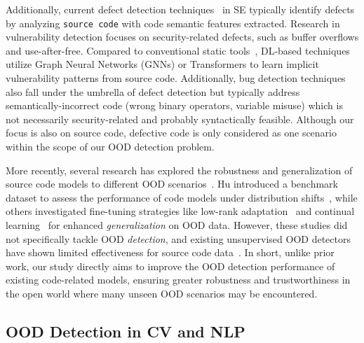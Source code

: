 Additionally, current defect detection techniques~\cite{lu2021codexglue} in SE typically identify defects by analyzing \texttt{\small source code} with code semantic features extracted. Research in vulnerability detection focuses on security-related defects, such as buffer overflows and use-after-free. Compared to conventional static tools~\cite{CodeQLtool, Checkmarxtool}, DL-based techniques~\cite{sejfia2024toward, steenhoek2024dataflow, cul2024liu, vul2024cao} utilize Graph Neural Networks (GNNs) or Transformers to learn implicit vulnerability patterns from source code. Additionally, bug detection techniques~\cite{kanade2020learning, chen2021plur, allamanis2021self, he2022distribution} also fall under the umbrella of defect detection but typically address semantically-incorrect code (\eg wrong binary operators, variable misuse) which is not necessarily security-related and probably syntactically feasible. Although our focus is also on source code, defective code is only considered as one scenario within the scope of our OOD detection problem. 

More recently, several research has explored the robustness and generalization of source code models to different OOD scenarios~\cite{hu2023codes, weyssow2023usage, hajipour2024simscood}. Hu \etal introduced a benchmark dataset to assess the performance of code models under distribution shifts~\cite{hu2023codes}, while others investigated fine-tuning strategies like low-rank adaptation~\cite{hajipour2024simscood} and continual learning~\cite{weyssow2023usage} for enhanced \textit{generalization} on OOD data. However, these studies did not specifically tackle OOD \textit{detection}, and existing unsupervised OOD detectors have shown limited effectiveness for source code data~\cite{hu2023codes}. In short, unlike prior work, our study directly aims to improve the OOD detection performance of existing code-related models, ensuring greater robustness and trustworthiness in the open world where many unseen OOD scenarios may be encountered.

\subsection{OOD Detection in CV and NLP}

